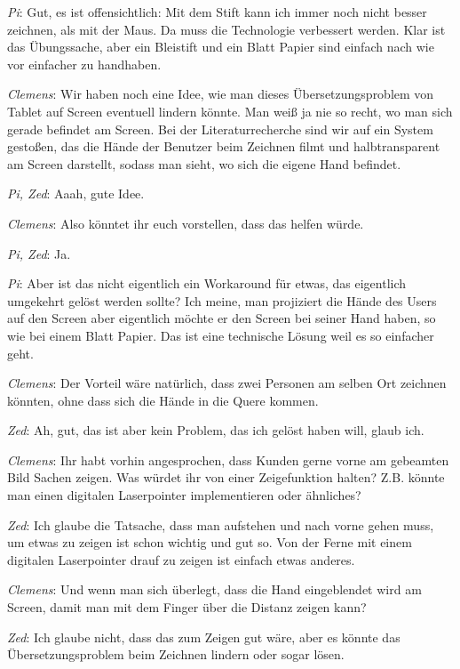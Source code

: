 \medskip \emph{Pi}: Gut, es ist offensichtlich: Mit dem Stift kann ich immer noch nicht besser zeichnen, als mit der Maus. Da muss die Technologie verbessert werden. Klar ist das Übungssache, aber ein Bleistift und ein Blatt Papier sind einfach nach wie vor einfacher zu handhaben.

\medskip \emph{Clemens}: Wir haben noch eine Idee, wie man dieses Übersetzungsproblem von Tablet auf Screen eventuell lindern könnte. Man weiß ja nie so recht, wo man sich gerade befindet am Screen. Bei der Literaturrecherche sind wir auf ein System gestoßen, das die Hände der Benutzer beim Zeichnen filmt und halbtransparent am Screen darstellt, sodass man sieht, wo sich die eigene Hand befindet.

\medskip \emph{Pi, Zed}: Aaah, gute Idee.

\medskip \emph{Clemens}: Also könntet ihr euch vorstellen, dass das helfen würde.

\medskip \emph{Pi, Zed}: Ja.

\medskip \emph{Pi}: Aber ist das nicht eigentlich ein Workaround für etwas, das eigentlich umgekehrt gelöst werden sollte? Ich meine, man projiziert die Hände des Users auf den Screen aber eigentlich möchte er den Screen bei seiner Hand haben, so wie bei einem Blatt Papier. Das ist eine technische Lösung weil es so einfacher geht.

\medskip \emph{Clemens}: Der Vorteil wäre natürlich, dass zwei Personen am selben Ort zeichnen könnten, ohne dass sich die Hände in die Quere kommen.

\medskip \emph{Zed}: Ah, gut, das ist aber kein Problem, das ich gelöst haben will, glaub ich.

\medskip \emph{Clemens}: Ihr habt vorhin angesprochen, dass Kunden gerne vorne am gebeamten Bild Sachen zeigen. Was würdet ihr von einer Zeigefunktion halten? Z.B. könnte man einen digitalen Laserpointer implementieren oder ähnliches?

\medskip \emph{Zed}: Ich glaube die Tatsache, dass man aufstehen und nach vorne gehen muss, um etwas zu zeigen ist schon wichtig und gut so. Von der Ferne mit einem digitalen Laserpointer drauf zu zeigen ist einfach etwas anderes. 

\medskip \emph{Clemens}: Und wenn man sich überlegt, dass die Hand eingeblendet wird am Screen, damit man mit dem Finger über die Distanz zeigen kann?

\medskip \emph{Zed}: Ich glaube nicht, dass das zum Zeigen gut wäre, aber es könnte das Übersetzungsproblem beim Zeichnen lindern oder sogar lösen.

